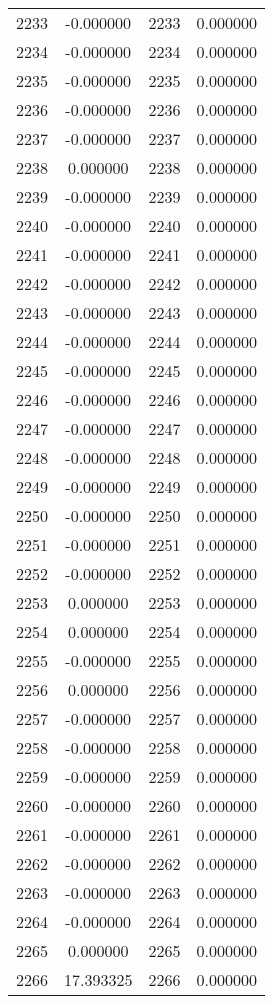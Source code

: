 \documentclass[12pt]{article}
\begin{document}
\begin{longtable}{@{}cccc@{}}
2233 & -0.000000 & 2233 & 0.000000 \\
2234 & -0.000000 & 2234 & 0.000000 \\
2235 & -0.000000 & 2235 & 0.000000 \\
2236 & -0.000000 & 2236 & 0.000000 \\
2237 & -0.000000 & 2237 & 0.000000 \\
2238 & 0.000000 & 2238 & 0.000000 \\
2239 & -0.000000 & 2239 & 0.000000 \\
2240 & -0.000000 & 2240 & 0.000000 \\
2241 & -0.000000 & 2241 & 0.000000 \\
2242 & -0.000000 & 2242 & 0.000000 \\
2243 & -0.000000 & 2243 & 0.000000 \\
2244 & -0.000000 & 2244 & 0.000000 \\
2245 & -0.000000 & 2245 & 0.000000 \\
2246 & -0.000000 & 2246 & 0.000000 \\
2247 & -0.000000 & 2247 & 0.000000 \\
2248 & -0.000000 & 2248 & 0.000000 \\
2249 & -0.000000 & 2249 & 0.000000 \\
2250 & -0.000000 & 2250 & 0.000000 \\
2251 & -0.000000 & 2251 & 0.000000 \\
2252 & -0.000000 & 2252 & 0.000000 \\
2253 & 0.000000 & 2253 & 0.000000 \\
2254 & 0.000000 & 2254 & 0.000000 \\
2255 & -0.000000 & 2255 & 0.000000 \\
2256 & 0.000000 & 2256 & 0.000000 \\
2257 & -0.000000 & 2257 & 0.000000 \\
2258 & -0.000000 & 2258 & 0.000000 \\
2259 & -0.000000 & 2259 & 0.000000 \\
2260 & -0.000000 & 2260 & 0.000000 \\
2261 & -0.000000 & 2261 & 0.000000 \\
2262 & -0.000000 & 2262 & 0.000000 \\
2263 & -0.000000 & 2263 & 0.000000 \\
2264 & -0.000000 & 2264 & 0.000000 \\
2265 & 0.000000 & 2265 & 0.000000 \\
2266 & 17.393325 & 2266 & 0.000000 \\

\end{longtable}
\end{document}
